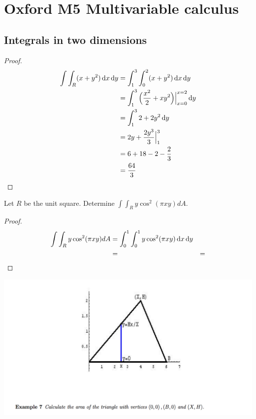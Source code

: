 \section{Oxford M5 Multivariable calculus}

\subsection{Integrals in two dimensions}

\begin{example*}[5]

\end{example*}

\begin{proof}
  \begin{align*}
    \int \int_R (x + y^2) \dx\dy
    &= \int_1^3 \int_0^2 (x + y^2) \dx\dy\\
    &= \int_1^3 \Big(\frac{x^2}{2} + xy^2\Big)\Big|_{x=0}^{x=2} \dy\\
    &= \int_1^3 2 + 2y^2 \dy\\
    &= 2y + \frac{2y^3}{3} \Big|_1^3\\
    &= 6 + 18 - 2 - \frac{2}{3}\\
    &= \frac{64}{3}
  \end{align*}
\end{proof}


\begin{example*}[6]
  Let $R$ be the unit square. Determine $\int\int_R y\cos^2(\pi xy) dA$.
\end{example*}


\begin{proof}
  \begin{align*}
    \int\int_R y\cos^2(\pi xy) dA
    &= \int_0^1\int_0^1 y\cos^2(\pi xy) \dx\dy\\
    &=
    &=
  \end{align*}
\end{proof}

\begin{mdframed}
\includegraphics[width=400pt]{img/oxford-prelims-M5-multivariable-calc-ex-7.png}
\end{mdframed}


